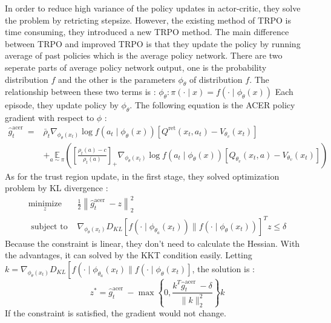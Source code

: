 In order to reduce high variance of the policy updates in actor-critic, they solve the problem by retricting stepsize. However, the existing method of TRPO is time consuming, they introduced a new TRPO method. The main difference between TRPO and improved TRPO is that they update the policy by running average of past policies which is the average policy network. 
There are two seperate parts of average policy network output, one is the probability distribution $f$ and the other is the parameters $\phi_{\theta}$ of distribution $f$. The relationship between these two terms is :
$\phi_{\theta}: \pi(\cdot \mid x)=f\left(\cdot \mid \phi_{\theta}(x)\right)$
Each episode, they update policy by $\phi_{\theta}$. The following equation is the ACER policy gradient with respect to $\phi$ :
$$
\begin{aligned}
    \widehat{g}_{t}^{\text {acer }}=& \bar{\rho}_{t} \nabla_{\phi_{\theta}\left(x_{t}\right)} \log f\left(a_{t} \mid \phi_{\theta}(x)\right)\left[Q^{\mathrm{ret}}\left(x_{t}, a_{t}\right)-V_{\theta_{v}}\left(x_{t}\right)\right] \\
    &+\underset{a \sim \pi}{\mathbb{E}}\left(\left[\frac{\rho_{t}(a)-c}{\rho_{t}(a)}\right]_{+} \nabla_{\phi_{\theta}\left(x_{t}\right)} \log f\left(a_{t} \mid \phi_{\theta}(x)\right)\left[Q_{\theta_{v}}\left(x_{t}, a\right)-V_{\theta_{v}}\left(x_{t}\right)\right]\right)
    \end{aligned}
$$
As for the trust region update, in the first stage, they solved optimization problem by KL divergence :
$$
\begin{array}{ll}
    \underset{z}{\operatorname{minimize}} & \frac{1}{2}\left\|\hat{g}_{t}^{\text {acer }}-z\right\|_{2}^{2} \\
    \text { subject to } & \nabla_{\phi_{\theta}\left(x_{t}\right)} D_{K L}\left[f\left(\cdot \mid \phi_{\theta_{a}}\left(x_{t}\right)\right) \| f\left(\cdot \mid \phi_{\theta}\left(x_{t}\right)\right)\right]^{T} z \leq \delta
    \end{array}
$$
Because the constraint is linear, they don't need to calculate the Hessian. With the advantages, it can solved by the KKT condition easily. Letting $k=\nabla_{\phi_{\theta}\left(x_{t}\right)} D_{K L}\left[f \left(\cdot \mid \phi_{\theta_{a}}\left(x_{t}\right) \| f\left(\cdot \mid \phi_{\theta}\left(x_{t}\right)\right]\right.\right.$, the solution is :
$$
z^{*}=\hat{g}_{t}^{\text {acer }}-\max \left\{0, \frac{k^{T} \hat{g}_{t}^{\text {acer }}-\delta}{\|k\|_{2}^{2}}\right\} k
$$
If the constraint is satisfied, the gradient would not change.
 
